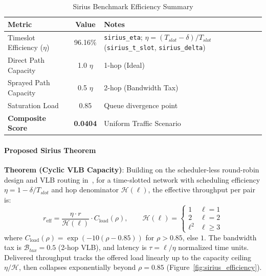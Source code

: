 \documentclass{article}
\begin{document}
    \begin{table}[H]
        \centering
        \caption{Sirius Benchmark Efficiency Summary}
        \begin{tabular}{|l|c|l|}
            \hline
            \textbf{Metric} & \textbf{Value} & \textbf{Notes} \\
            \hline
            Timeslot Efficiency ($\eta$) & 96.16\% & \texttt{sirius\_eta}; $\eta = (T_{slot}-\delta)/T_{slot}$ (\texttt{sirius\_t\_slot}, \texttt{sirius\_delta}) \\
            Direct Path Capacity & 1.0 $\eta$ & 1-hop (Ideal) \\
            Sprayed Path Capacity & 0.5 $\eta$ & 2-hop (Bandwidth Tax) \\
            Saturation Load & 0.85 & Queue divergence point \\
            \textbf{Composite Score} & \textbf{0.0404} & Uniform Traffic Scenario \\
            \hline
        \end{tabular}
        \label{tab:sirius_efficiency}
    \end{table}

    \paragraph{Proposed Sirius Theorem}
    \textbf{Theorem (Cyclic VLB Capacity)}: Building on the scheduler-less round-robin design and VLB routing in~\cite{sirius}, for a time-slotted network with scheduling efficiency $\eta = 1 - \delta/T_{slot}$ and hop denominator $\mathcal{H}(\ell)$, the effective throughput per pair is:
    \begin{equation}
        r_{\text{eff}} = \frac{\eta \cdot r}{\mathcal{H}(\ell)} \cdot C_{\text{load}}(\rho), \qquad
        \mathcal{H}(\ell) = \begin{cases} 1 & \ell=1 \\ 2 & \ell=2 \\ \ell^2 & \ell \geq 3 \end{cases}
    \end{equation}
    where $C_{\text{load}}(\rho) = \exp(-10(\rho - 0.85))$ for $\rho > 0.85$, else $1$. The bandwidth tax is $\mathcal{B}_{tax} = 0.5$ (2-hop VLB), and latency is $\tau = \ell/\eta$ normalized time units. Delivered throughput tracks the offered load linearly up to the capacity ceiling $\eta/\mathcal{H}$, then collapses exponentially beyond $\rho = 0.85$ (Figure~\ref{fig:sirius_efficiency}).
\end{document}
